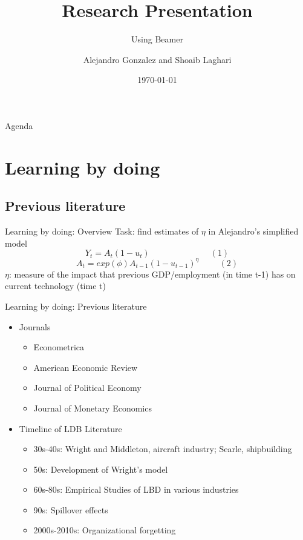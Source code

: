 \documentclass{beamer}
\title{Research Presentation}
\subtitle{Using Beamer}
\author{Alejandro Gonzalez and Shoaib Laghari}
\institute{University of Washington and Washington University}
\date{\today} %
\begin{document}
\begin{frame}
    \titlepage
\end{frame}

\begin{frame}{Agenda}
    \tableofcontents
\end{frame}

\section{Learning by doing}
\subsection{Previous literature}
\begin{frame}{Learning by doing: Overview}
    Task: find estimates of $\eta$ in Alejandro's simplified model
    \[ Y_t = A_t (1- u_t) \hspace{3cm} (1) \] 
    \[ A_t = exp(\phi) A_{t-1} (1 - u_{t-1})^{\eta} \hspace{1cm} (2) \]
    \newline
    \newline
    $\eta$: measure of the impact that previous GDP/employment (in time t-1) has on current technology (time t)
\end{frame}

\begin{frame}{Learning by doing: Previous literature}
    \begin{itemize}
        \item Journals
        \begin{itemize}
            \item Econometrica
            \item American Economic Review
            \item Journal of Political Economy
            \item Journal of Monetary Economics
        \end{itemize}
        \item Timeline of LDB Literature
        \begin{itemize}
            \item 30s-40s: Wright and Middleton, aircraft industry; Searle, shipbuilding
            \item 50s: Development of Wright's model
            \item 60s-80s: Empirical Studies of LBD in various industries
            \item 90s: Spillover effects
            \item 2000s-2010s: Organizational forgetting
        \end{itemize}
    \end{itemize}
\end{frame}
\end{document}
